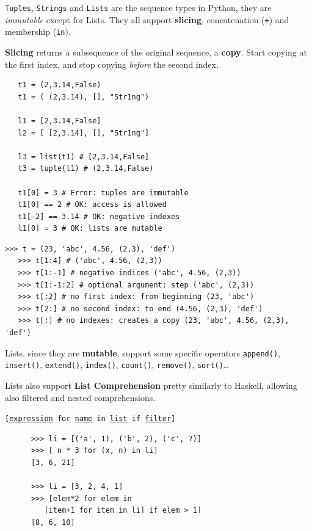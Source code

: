 \begin{paracol}{2}
   \colfill
   \texttt{Tuples}, \texttt{Strings} and \texttt{Lists} are the sequence types in Python, they are \textit{immutable} except for Lists.
   They all support \textbf{slicing}, concatenation (\lstinline|+|) and membership (\lstinline|in|).
   
   \textbf{Slicing} returns a subsequence of the original sequence, a \textbf{copy}.
   Start copying
   at the first index, and stop copying \textit{before} the second index.
   
   \colfill
   \switchcolumn

   \begin{lstlisting}
   t1 = (2,3.14,False) 
   t1 = ( (2,3.14), [], "5tr1ng") 
   
   l1 = [2,3.14,False]
   l2 = [ [2,3.14], [], "5tr1ng"]
   
   l3 = list(t1) # [2,3.14,False]
   t3 = tuple(l1) # (2,3.14,False)
   
   t1[0] = 3 # Error: tuples are immutable
   t1[0] == 2 # OK: access is allowed
   t1[-2] == 3.14 # OK: negative indexes
   l1[0] = 3 # OK: lists are mutable
   \end{lstlisting}
   
\end{paracol}


\begin{lstlisting}[caption={Slicing examples}]
   >>> t = (23, 'abc', 4.56, (2,3), 'def')
   >>> t[1:4] # ('abc', 4.56, (2,3))
   >>> t[1:-1] # negative indices ('abc', 4.56, (2,3))
   >>> t[1:-1:2] # optional argument: step ('abc', (2,3))
   >>> t[:2] # no first index: from beginning (23, 'abc')
   >>> t[2:] # no second index: to end (4.56, (2,3), 'def')
   >>> t[:] # no indexes: creates a copy (23, 'abc', 4.56, (2,3), 'def')
\end{lstlisting}

\begin{paracol}{2}
   \colfill
   Lists, since they are \textbf{mutable}, support some specific operators \lstinline|append()|, \lstinline|insert()|, \lstinline|extend()|, \lstinline|index()|, \lstinline|count()|, \lstinline|remove()|, \lstinline|sort()|\dots 
   
   Lists also support \textbf{List Comprehension} pretty similarly to Haskell, allowing also filtered and nested comprehensions.
   
   \texttt{[\ul{expression} for \ul{name} in \ul{list} if \ul{filter}]}
   \colfill
   
   \switchcolumn

   \begin{lstlisting}
      >>> li = [('a', 1), ('b', 2), ('c', 7)]
      >>> [ n * 3 for (x, n) in li]
      [3, 6, 21]
      
      >>> li = [3, 2, 4, 1]
      >>> [elem*2 for elem in
         [item+1 for item in li] if elem > 1]
      [8, 6, 10]
   \end{lstlisting}
\end{paracol}

